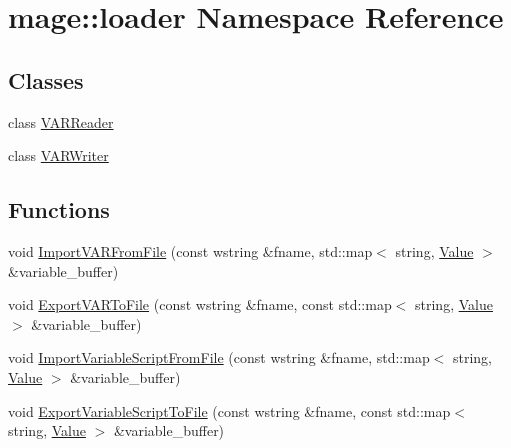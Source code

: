 \hypertarget{namespacemage_1_1loader}{}\section{mage\+:\+:loader Namespace Reference}
\label{namespacemage_1_1loader}
\subsection*{Classes}
\begin{DoxyCompactItemize}
\item 
class \mbox{\hyperlink{classmage_1_1loader_1_1_v_a_r_reader}{V\+A\+R\+Reader}}
\item 
class \mbox{\hyperlink{classmage_1_1loader_1_1_v_a_r_writer}{V\+A\+R\+Writer}}
\end{DoxyCompactItemize}
\subsection*{Functions}
\begin{DoxyCompactItemize}
\item 
void \mbox{\hyperlink{namespacemage_1_1loader_a03513131b24e70c81e6956df5f92b520}{Import\+V\+A\+R\+From\+File}} (const wstring \&fname, std\+::map$<$ string, \mbox{\hyperlink{namespacemage_aa1fe0628487e0706e44efdc62dbdb3a2}{Value}} $>$ \&variable\+\_\+buffer)
\item 
void \mbox{\hyperlink{namespacemage_1_1loader_aff43f426c240958542537ad374dca201}{Export\+V\+A\+R\+To\+File}} (const wstring \&fname, const std\+::map$<$ string, \mbox{\hyperlink{namespacemage_aa1fe0628487e0706e44efdc62dbdb3a2}{Value}} $>$ \&variable\+\_\+buffer)
\item 
void \mbox{\hyperlink{namespacemage_1_1loader_ace2beab3ac83ed7d27f24e392ae981cc}{Import\+Variable\+Script\+From\+File}} (const wstring \&fname, std\+::map$<$ string, \mbox{\hyperlink{namespacemage_aa1fe0628487e0706e44efdc62dbdb3a2}{Value}} $>$ \&variable\+\_\+buffer)
\item 
void \mbox{\hyperlink{namespacemage_1_1loader_a1d82435c3f70b2a58351652947c309b2}{Export\+Variable\+Script\+To\+File}} (const wstring \&fname, const std\+::map$<$ string, \mbox{\hyperlink{namespacemage_aa1fe0628487e0706e44efdc62dbdb3a2}{Value}} $>$ \&variable\+\_\+buffer)
\end{DoxyCompactItemize}

